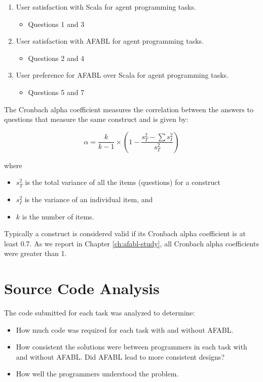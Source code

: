 \begin{enumerate}

\item User satisfaction with Scala for agent programming tasks.
\begin{itemize}
\item Questions 1 and 3
\end{itemize}

\item User satisfaction with AFABL for agent programming tasks.
\begin{itemize}
\item  Questions 2 and 4
\end{itemize}

\item User preference for AFABL over Scala for agent programming tasks.
\begin{itemize}
\item Questions 5 and 7
\end{itemize}

\end{enumerate}

The Cronbach alpha coefficient measures the correlation between the answers to questions that measure the same construct and is given by:

\[
\alpha = \frac{k}{k - 1} \times (1 - \frac{s_{T}^{2} - \sum s_{I}^{2}}{s_{T}^{2}})
\]

where
\begin{itemize}
\item $s_T^2$ is the total variance of all the items (questions) for a construct
\item $s_I^2$ is the variance of an individual item, and
\item $k$ is the number of items.
\end{itemize}

Typically a construct is considered valid if its Cronbach alpha coefficient is at least 0.7. As we report in Chapter \ref{ch:afabl-study}, all Cronbach alpha coefficients were greater than 1.

\section{Source Code Analysis}

The code submitted for each task was analyzed to determine:

\begin{itemize}
\item How much code was required for each task with and without AFABL.
\item How consistent the solutions were between programmers in each task with and without AFABL.  Did AFABL lead to more consistent designs?
\item How well the programmers understood the problem.
\end{itemize}


